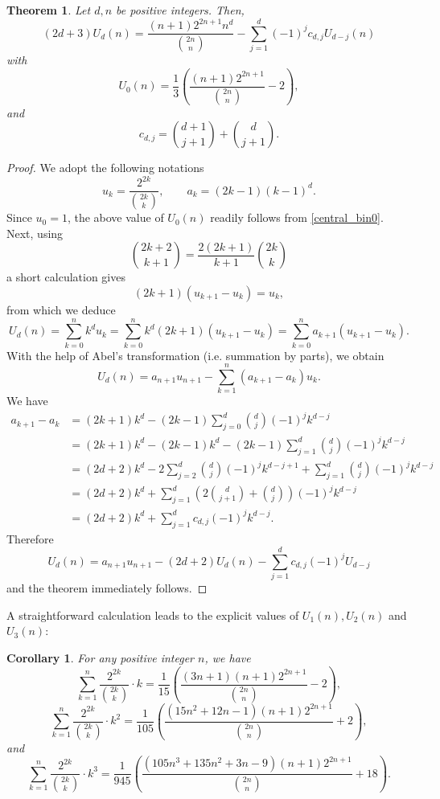 \documentclass[11pt,reqno]{amsart}
\theoremstyle{plain}
\numberwithin{equation}{section}
\newtheorem{theorem}[thm]{Theorem}
\newtheorem{corollary}[thm]{Corollary}
\begin{document}
\begin{theorem}\label{main_thm_rec1} 
Let $d,n$ be positive integers. Then, 
\begin{equation}
(2d+3)U_d(n) = \frac{(n+1)2^{2n+1}n^d}{\binom{2n}{n}} - \sum_{j=1}^d (-1)^j c_{d,j} U_{d-j}(n)
\end{equation}
with
$$U_0(n) = \frac{1}{3}\left( \frac{(n+1)2^{2n+1}}{\binom{2n}{n}}-2\right),$$
and
\begin{equation}\label{c_term}
c_{d,j} = \binom{d+1}{j+1} + \binom{d}{j+1}.
\end{equation}
\end{theorem}
\begin{proof}
We adopt the following notations
$$u_k = \frac{2^{2k}}{\binom{2k}{k}},\qquad  a_k = (2k-1)(k-1)^d.$$
Since $u_0=1$, the above value of $U_0(n)$ readily follows from \eqref{central_bin0}. Next, using 
$$\binom{2k+2}{k+1} = \frac{2(2k+1)}{k+1}\binom{2k}{k}$$
a short calculation gives
$$(2k+1)(u_{k+1}-u_k) = u_k,$$
from which we deduce
$$U_d(n) = \sum_{k=0}^n k^d u_k = \sum_{k=0}^n k^d (2k+1)(u_{k+1} - u_k) = \sum_{k=0}^n a_{k+1}(u_{k+1}-u_k).$$
With the help of Abel's transformation (i.e. summation by parts), we obtain
$$U_d(n) = a_{n+1}u_{n+1} - \sum_{k=1}^n (a_{k+1}-a_k) u_k.$$
We have
\begin{align*} 
a_{k+1}-a_k&=(2k+1)k^d-(2k-1)\sum_{j=0}^d\binom{d}{j}(-1)^j k^{d-j}\\
&=(2k+1)k^d-(2k-1)k^d-(2k-1)\sum_{j=1}^d\binom{d}{j}(-1)^j k^{d-j}\\
&=(2d+2)k^d-2\sum_{j=2}^d \binom{d}{j}(-1)^j k^{d-j+1}+\sum_{j=1}^d\binom{d}{j}(-1)^j k^{d-j}\\
&=(2d+2)k^d+\sum_{j=1}^d\left(2\binom{d}{j+1}+\binom{d}{j}\right)(-1)^jk^{d-j}\\
&=(2d+2)k^d+\sum_{j=1}^d c_{d,j}(-1)^j k^{d-j}.
\end{align*}
Therefore
$$U_d(n) = a_{n+1}u_{n+1} - (2d+2) U_d(n) - \sum_{j=1}^d c_{d,j}(-1)^j U_{d-j}$$
and the theorem immediately follows.
\end{proof}

A straightforward calculation leads to the explicit values of $U_1(n), U_2(n)$ and $U_3(n)$:

\begin{corollary}
For any positive integer $n$, we have
\begin{equation}
\sum_{k=1}^n \frac{2^{2k}}{\binom{2k}{k}}\cdot k = \frac{1}{15} \left(\frac{(3n+1)(n+1)2^{2n+1}}{\binom{2n}{n}}-2\right),
\end{equation}
\begin{equation}
\sum_{k=1}^n \frac{2^{2k}}{\binom{2k}{k}}\cdot k^2 = \frac{1}{105}\left(\frac{(15n^2+12n-1)(n+1)2^{2n+1}}{\binom{2n}{n}}+2\right),
\end{equation}
and
\begin{equation}
\sum_{k=1}^n \frac{2^{2k}}{\binom{2k}{k}}\cdot k^3 = \frac{1}{945}\left(\frac{(105n^3+135n^2+3n-9)(n+1)2^{2n+1}}{\binom{2n}{n}}+18\right).
\end{equation}
\end{corollary}
\end{document}
